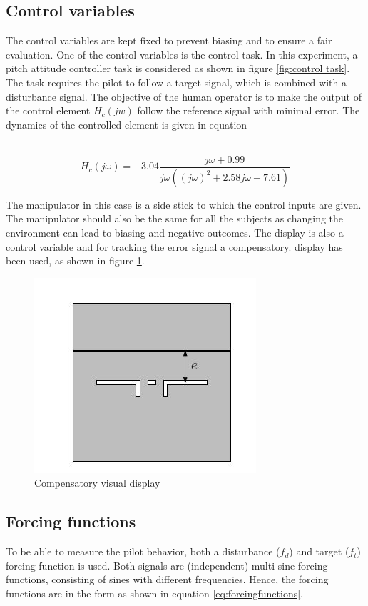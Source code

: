 \documentclass[conference]{IEEEtran}
\begin{document}
\subsection{Control variables}
The control variables are kept fixed to prevent biasing and to ensure a fair evaluation. One of the control variables is the control task. In this experiment, a pitch attitude controller task is considered as shown in figure \ref{fig:control task}. The task requires the pilot to follow a target signal, which is combined with a disturbance signal. The objective of the human operator is to make the output of the control element $H_c(jw)$ follow the reference signal with minimal error. The dynamics of the controlled element is given in equation \\\

\begin{equation}
H_{c}(j \omega)=-3.04 \frac{j \omega + 0.99}{j \omega\left((j \omega)^{2}+2.58 j \omega+7.61\right)}
\end{equation}

The manipulator in this case is a side stick to which the control inputs are given. The manipulator should also be the same for all the subjects as changing the environment can lead to biasing and negative outcomes. The display is also a control variable and for tracking the error signal a compensatory. display has been used, as shown in figure \ref{fig:comp disp}.

\begin{figure}[h]
    \centering
    \includegraphics[scale = 1]{images/compensatory.JPG}
    \caption{Compensatory visual display}
    \label{fig:comp disp}
\end{figure}



\subsection{Forcing functions}
To be able to measure the pilot behavior, both a disturbance ($f_d$) and target ($f_t$) forcing function is used. Both signals are (independent) multi-sine forcing functions, consisting of sines with different frequencies. Hence, the forcing functions are in the form as shown in equation \ref{eq:forcingfunctions}.\\
\end{document}
